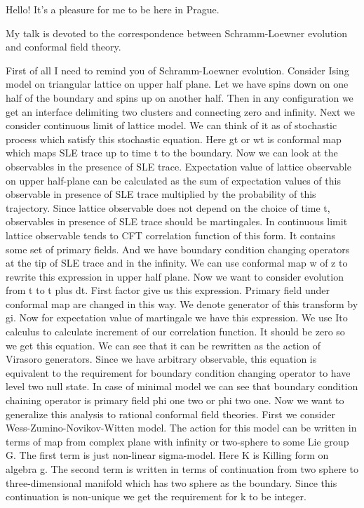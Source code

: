 \documentclass{article}
\begin{document}
Hello!
It's a pleasure for me to be here in Prague. 

My talk is devoted to the correspondence between Schramm-Loewner evolution and conformal field theory.

First of all I need to remind you of Schramm-Loewner evolution.
Consider Ising model on triangular lattice on upper half plane. Let we have spins down on one half of the boundary and spins up on another half. Then in any configuration we get an interface delimiting two clusters and connecting zero and infinity. 
Next we consider continuous limit of lattice model. We can think of it as of stochastic process which satisfy this stochastic equation. Here gt or wt is conformal map which maps SLE trace up to time t to the boundary. 
Now we can look at the observables in the presence of SLE trace. Expectation value of lattice observable on upper half-plane can be calculated as the sum of expectation values of this observable in presence of SLE trace multiplied by the probability of this trajectory. 
Since lattice observable does not depend on the choice of time t, observables in presence of SLE trace should be martingales. 
In continuous limit lattice observable tends to CFT correlation function of this form. It contains some set of primary fields. And we have boundary condition changing operators at the tip of SLE trace and in the infinity. 
We can use conformal map w of z to rewrite this expression in upper half plane. 
Now we want to consider evolution from t to t plus dt. First factor give us this expression. Primary field under conformal map are changed in this way.
We denote generator of this transform by gi.
Now for expectation value of martingale we have this expression. We use Ito calculus to calculate increment of our correlation function. It should be zero so we get this equation.
We can see that it can be rewritten as the action of Virasoro generators. Since we have arbitrary observable, this equation is equivalent to the requirement for boundary condition changing operator to have level two null state. 
In case of minimal model we can see that boundary condition chaining operator is primary field phi one two or phi two one. 
Now we want to generalize this analysis to rational conformal field theories. First we consider Wess-Zumino-Novikov-Witten model. The action for this model can be written in terms of map from complex plane with infinity or two-sphere to some Lie group G. 
The first term is just non-linear sigma-model. Here K is Killing form on algebra g. The second term is written in terms of continuation from two sphere to three-dimensional manifold which has two sphere as the boundary. Since this continuation is non-unique we get the requirement for k to be integer. 
\end{document}
